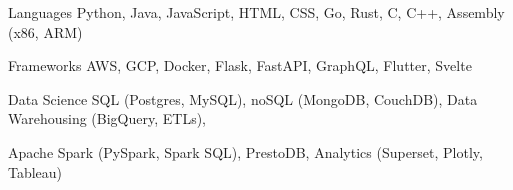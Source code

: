 
\begin{cvskills}
  \cvskill
    {Languages} %
    {Python, Java, JavaScript, HTML, CSS, Go, Rust, C, C++, Assembly (x86, ARM)} %

  \cvskill
    {Frameworks} %
    {AWS, GCP, Docker, Flask, FastAPI, GraphQL, Flutter, Svelte} %
  
  \cvskill
    {Data Science} %
    {SQL (Postgres, MySQL), noSQL (MongoDB, CouchDB), Data Warehousing (BigQuery, ETLs),} %
  
  \cvskill
    {}
    {Apache Spark (PySpark, Spark SQL), PrestoDB, Analytics (Superset, Plotly, Tableau)}
\end{cvskills}
